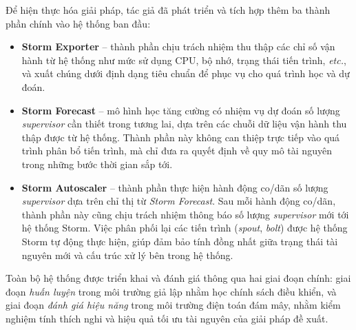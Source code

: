 Để hiện thực hóa giải pháp, tác giả đã phát triển và tích hợp thêm ba thành phần chính vào hệ thống ban đầu:

\begin{itemize}
    \item \textbf{Storm Exporter} – thành phần chịu trách nhiệm thu thập các chỉ số vận hành từ hệ thống như mức sử dụng CPU, bộ nhớ, trạng thái tiến trình, \textit{etc.}, và xuất chúng dưới định dạng tiêu chuẩn để phục vụ cho quá trình học và dự đoán.

    \item \textbf{Storm Forecast} – mô hình học tăng cường có nhiệm vụ dự đoán số lượng \textit{supervisor} cần thiết trong tương lai, dựa trên các chuỗi dữ liệu vận hành thu thập được từ hệ thống. Thành phần này không can thiệp trực tiếp vào quá trình phân bổ tiến trình, mà chỉ đưa ra quyết định về quy mô tài nguyên trong những bước thời gian sắp tới.

    \item \textbf{Storm Autoscaler} – thành phần thực hiện hành động co/dãn số lượng \textit{supervisor} dựa trên chỉ thị từ \textit{Storm Forecast}. Sau mỗi hành động co/dãn, thành phần này cũng chịu trách nhiệm thông báo số lượng \textit{supervisor} mới tới hệ thống Storm. Việc phân phối lại các tiến trình (\textit{spout}, \textit{bolt}) được hệ thống Storm tự động thực hiện, giúp đảm bảo tính đồng nhất giữa trạng thái tài nguyên mới và cấu trúc xử lý bên trong hệ thống.
\end{itemize}

Toàn bộ hệ thống được triển khai và đánh giá thông qua hai giai đoạn chính: giai đoạn \textit{huấn luyện} trong môi trường giả lập nhằm học chính sách điều khiển, và giai đoạn \textit{đánh giá hiệu năng} trong môi trường điện toán đám mây, nhằm kiểm nghiệm tính thích nghi và hiệu quả tối ưu tài nguyên của giải pháp đề xuất.